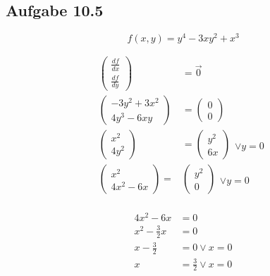 \documentclass{standalone}
\begin{document}
\subsection{Aufgabe 10.5}

$$ f(x,y) = y^4 - 3xy^2 + x^3 $$

\begin{align}
    \begin{pmatrix}
        \frac{df}{dx} \\
        \frac{df}{dy}
    \end{pmatrix}
    &= \vec{0}\\
    \begin{pmatrix}
        -3y^2 + 3x^2 \\
        4y^3 - 6xy
    \end{pmatrix}
    &= \begin{pmatrix}
        0 \\
        0
    \end{pmatrix} \\
    \begin{pmatrix}
        x^2 \\
        4y^2
    \end{pmatrix}
    &= \begin{pmatrix}
        y^2 \\
        6x
    \end{pmatrix}
    \begin{matrix}
        \\
        \vee y = 0
    \end{matrix} \\
    \begin{pmatrix}
        x^2 \\
        4x^2 - 6x 
    \end{pmatrix}
    =& \begin{pmatrix}
        y^2 \\
        0
    \end{pmatrix}
    \begin{matrix}
        \\
        \vee y = 0
    \end{matrix} \\
\end{align}

\begin{align}
    4x^2 - 6 x &= 0 \\
    x^2 - \frac{3}{2} x &= 0 \\
    x - \frac{3}{2} &= 0 \vee x = 0 \\
    x &= \frac{3}{2} \vee x = 0
\end{align}
\end{document}
